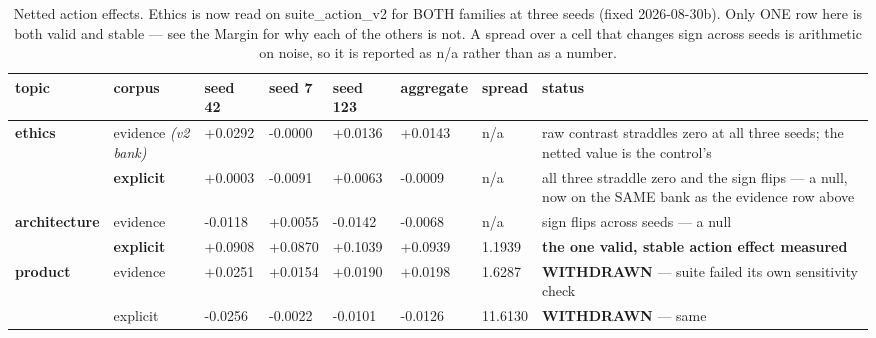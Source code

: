 \begin{table}[htbp]
\centering
\footnotesize
\caption{Netted action effects. Ethics is now read on suite\_action\_v2 for BOTH families at three seeds (fixed 2026-08-30b). Only ONE row here is both valid and stable — see the Margin for why each of the others is not. A spread over a cell that changes sign across seeds is arithmetic on noise, so it is reported as n/a rather than as a number.}
\label{tab:neta}
\begin{tabular}{ lllllllp{4.16cm} }
\toprule
topic & corpus & seed 42 & seed 7 & seed 123 & aggregate & spread & status \\
\midrule
\textbf{ethics} & evidence \emph{(v2 bank)} & +0.0292 & -0.0000 & +0.0136 & +0.0143 & n/a & raw contrast straddles zero at all three seeds; the netted value is the control's \\
 & \textbf{explicit} & +0.0003 & -0.0091 & +0.0063 & -0.0009 & n/a & all three straddle zero and the sign flips — a null, now on the SAME bank as the evidence row above \\
\textbf{architecture} & evidence & -0.0118 & +0.0055 & -0.0142 & -0.0068 & n/a & sign flips across seeds — a null \\
 & \textbf{explicit} & +0.0908 & +0.0870 & +0.1039 & +0.0939 & 1.1939 & \textbf{the one valid, stable action effect measured} \\
\textbf{product} & evidence & +0.0251 & +0.0154 & +0.0190 & +0.0198 & 1.6287 & \textbf{WITHDRAWN} — suite failed its own sensitivity check \\
 & explicit & -0.0256 & -0.0022 & -0.0101 & -0.0126 & 11.6130 & \textbf{WITHDRAWN} — same \\
\bottomrule
\end{tabular}
\end{table}
